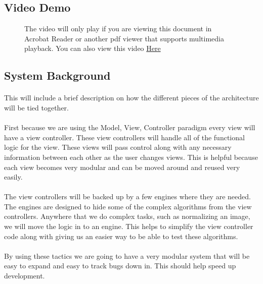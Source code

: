 \newpage
\subsection{Video Demo}

\begin{figure}[H!htb]
\centering
{}
\caption{The video will only play if you are viewing this document in Acrobat Reader or another pdf viewer that supports multimedia playback. You can also view this video \href{http://youtu.be/dN2K_zHrJ9M}{\color{blue}Here}}
\end{figure}

\subsection{System Background}
\paragraph{} This will include a brief description on how the different pieces of the architecture will be tied together.
\paragraph{} First because we are using the Model, View, Controller paradigm every view will have a view controller. These view controllers will handle all of the functional logic for the view. These views will pass control along with any necessary information between each other as the user changes views. This is helpful because each view becomes very modular and can be moved around and reused very easily.
\paragraph{} The view controllers will be backed up by a few engines where they are needed. The engines are designed to hide some of the complex algorithms from the view controllers. Anywhere that we do complex tasks, such as normalizing an image, we will move the logic in to an engine. This helps to simplify the view controller code along with giving us an easier way to be able to test these algorithms.
\paragraph{} By using these tactics we are going to have a very modular system that will be easy to expand and easy to track bugs down in. This should help speed up development.

